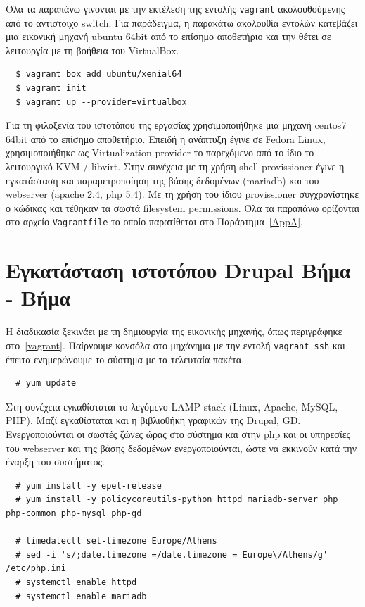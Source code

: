 \documentclass[12pt]{report}
\begin{document}
Όλα τα παραπάνω γίνονται με την εκτέλεση της εντολής \textlatin{\texttt{vagrant}} ακολουθούμενης από το αντίστοιχο \textlatin{switch}. Για παράδειγμα, η παρακάτω ακολουθία εντολών κατεβάζει μια εικονική μηχανή \textlatin{ubuntu 64bit} από το επίσημο αποθετήριο και την θέτει σε λειτουργία με τη βοήθεια του \textlatin{VirtualBox}.
\scriptsize
\begin{verbatim}
  $ vagrant box add ubuntu/xenial64
  $ vagrant init
  $ vagrant up --provider=virtualbox
\end{verbatim}
\normalsize
{}

Για τη φιλοξενία του ιστοτόπου της εργασίας χρησιμοποιήθηκε μια μηχανή \textlatin{centos7 64bit} από το επίσημο αποθετήριο. Επειδή η ανάπτυξη έγινε σε \textlatin{Fedora Linux}, χρησιμοποιήθηκε ως \textlatin{Virtualization provider} το παρεχόμενο από το ίδιο το λειτουργικό \textlatin{KVM / libvirt}. Στην συνέχεια με τη χρήση \textlatin{shell provissioner} έγινε η εγκατάσταση και παραμετροποίηση της βάσης δεδομένων (\textlatin{mariadb}) και του \textlatin{webserver (apache 2.4, php 5.4)}. Με τη χρήση του ίδιου \textlatin{provissioner} συγχρονίστηκε ο κώδικας και τέθηκαν τα σωστά \textlatin{filesystem permissions}.
Όλα τα παραπάνω ορίζονται στο αρχείο \textlatin{\texttt{Vagrantfile}} το οποίο παρατίθεται στο Παράρτημα~\ref{AppA}.

\section{Εγκατάσταση ιστοτόπου \textlatin{Drupal} Βήμα - Βήμα}\label{manual_setup}
Η διαδικασία ξεκινάει με τη δημιουργία της εικονικής μηχανής, όπως περιγράφηκε στο~\ref{vagrant}. Παίρνουμε κονσόλα στο μηχάνημα με την εντολή \textlatin{\texttt{vagrant ssh}} και έπειτα ενημερώνουμε το σύστημα με τα τελευταία πακέτα.
\scriptsize
\begin{verbatim}
  # yum update
\end{verbatim}
\normalsize
{}

Στη συνέχεια εγκαθίσταται το λεγόμενο \textlatin{LAMP stack (Linux, Apache, MySQL, PHP)}. Μαζί εγκαθίσταται και η βιβλιοθήκη γραφικών της \textlatin{Drupal, GD}. Ενεργοποιούνται οι σωστές ζώνες ώρας στο σύστημα και στην \textlatin{php} και οι υπηρεσίες του \textlatin{webserver} και της βάσης δεδομένων ενεργοποιούνται, ώστε να εκκινούν κατά την έναρξη του συστήματος.
\scriptsize
\begin{verbatim}
  # yum install -y epel-release
  # yum install -y policycoreutils-python httpd mariadb-server php php-common php-mysql php-gd

  # timedatectl set-timezone Europe/Athens
  # sed -i 's/;date.timezone =/date.timezone = Europe\/Athens/g' /etc/php.ini
  # systemctl enable httpd
  # systemctl enable mariadb
\end{verbatim}
\normalsize
{}
\end{document}

